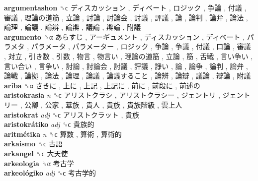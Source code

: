 \textbf{argumentashon} ␝ϲ   ディスカッション ,  ディベート ,  ロジック ,  争論 ,  付議 ,  審議 ,  理論の道筋 ,  立論 ,  討論 ,  討論会 ,  討議 ,  評議 ,  論 ,  論判 ,  論弁 ,  論法 ,  論理 ,  論議 ,  論辨 ,  論辯 ,  議論 ,  辯論 ,  附議   \\
\textbf{argumento} ␝α   あらすじ ,  アーギュメント ,  ディスカッション ,  ディベート ,  パラメタ ,  パラメータ ,  パラメーター ,  ロジック ,  争論 ,  争議 ,  付議 ,  口論 ,  審議 ,  対立 ,  引き数 ,  引数 ,  物言 ,  物言い ,  理論の道筋 ,  立論 ,  筋 ,  舌戦 ,  言い争い ,  言い合い ,  言争い ,  討論 ,  討論会 ,  討議 ,  評議 ,  諍い ,  論 ,  論争 ,  論判 ,  論弁 ,  論戦 ,  論拠 ,  論法 ,  論理 ,  論議 ,  論議すること ,  論辨 ,  論辯 ,  議論 ,  辯論 ,  附議   \\
\textbf{ariba} ␝α   さきに ,  上に ,  上記 ,  上記に ,  前に ,  前段に ,  前述の   \\
\textbf{aristokrasia} \emph{n}  ␝ϲ   アリストクラシ ,  アリストクラシー ,  ジェントリ ,  ジェントリー ,  公卿 ,  公家 ,  華族 ,  貴人 ,  貴族 ,  貴族階級 ,  雲上人   \\
\textbf{aristokrat} \emph{adj}  ␝ϲ   アリストクラット ,  貴族   \\
\textbf{aristokrátiko} \emph{adj}  ␝ϲ   貴族的   \\
\textbf{aritmétika} \emph{n}  ␝ϲ   算数 ,  算術 ,  算術的   \\
\textbf{arkaismo} ␝ϲ   古語   \\
\textbf{arkangel} ␝ϲ   大天使   \\
\textbf{arkeologia} ␝α   考古学   \\
\textbf{arkeológiko} \emph{adj}  ␝ϲ   考古学的   \\

